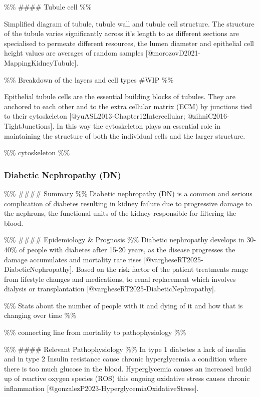 \documentclass[
  paper=a4,
  ,captions=tableheading
]{scrartcl}
\renewenvironment{quote}{\begin{customblockquote}\list{}{\rightmargin=0em\leftmargin=0em}%
\item\relax\color{blockquote-text}\ignorespaces}{\unskip\unskip\endlist\end{customblockquote}}
\begin{document}
\%\% \#\#\#\# Tubule cell \%\%

\begin{quote}
{} Simplified diagram of tubule, tubule wall and tubule cell structure.
The structure of the tubule varies significantly across it's length to
as different sections are specialised to permeate different resources,
the lumen diameter and epithelial cell height values are averages of
random samples {[}@morozovD2021-MappingKidneyTubule{]}.
\end{quote}

\%\% Breakdown of the layers and cell types \#WIP \%\%

Epithelial tubule cells are the essential building blocks of tubules.
They are anchored to each other and to the extra cellular matrix (ECM)
by junctions tied to their cytoskeleton
{[}@yuASL2013-Chapter12Intercellular; @zihniC2016-TightJunctions{]}. In
this way the cytoskeleton plays an essential role in maintaining the
structure of both the individual cells and the larger structure.

\%\% cytoskeleton \%\%

\subsubsection{Diabetic Nephropathy (DN)}\label{diabetic-nephropathy-dn}

\%\% \#\#\#\# Summary \%\% Diabetic nephropathy (DN) is a common and
serious complication of diabetes resulting in kidney failure due to
progressive damage to the nephrons, the functional units of the kidney
responsible for filtering the blood.

\%\% \#\#\#\# Epidemiology \& Prognosis \%\% Diabetic nephropathy
develops in 30-40\% of people with diabetes after 15-20 years, as the
disease progresses the damage accumulates and mortality rate rises
{[}@vargheseRT2025-DiabeticNephropathy{]}. Based on the risk factor of
the patient treatments range from lifestyle changes and medications, to
renal replacement which involves dialysis or transplantation
{[}@vargheseRT2025-DiabeticNephropathy{]}.

\%\% Stats about the number of people with it and dying of it and how
that is changing over time \%\%

\%\% connecting line from mortality to pathophysiology \%\%

\%\% \#\#\#\# Relevant Pathophysiology \%\% In type 1 diabetes a lack of
insulin and in type 2 Insulin resistance cause chronic hyperglycemia a
condition where there is too much glucose in the blood. Hyperglycemia
causes an increased build up of reactive oxygen species (ROS) this
ongoing oxidative stress causes chronic inflammation
{[}@gonzalezP2023-HyperglycemiaOxidativeStress{]}.
\end{document}
